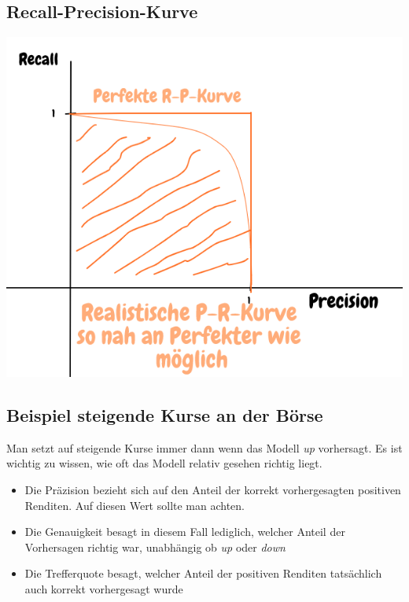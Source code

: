 \documentclass{report}
\begin{document}
\subsection{Recall-Precision-Kurve}
\begin{center}
  \includegraphics[scale=.225]{ml03_8}
\end{center}

\subsection{Beispiel steigende Kurse an der Börse}
Man setzt auf steigende Kurse immer dann wenn das Modell \textit{up} vorhersagt. Es ist wichtig zu wissen, wie oft das Modell relativ gesehen richtig liegt.
\begin{itemize}
  \item Die Präzision bezieht sich auf den Anteil der korrekt vorhergesagten positiven Renditen. Auf diesen Wert sollte man achten.
  \item Die Genauigkeit besagt in diesem Fall lediglich, welcher Anteil der Vorhersagen richtig war, unabhängig ob \textit{up} oder \textit{down}
  \item Die Trefferquote besagt, welcher Anteil der positiven Renditen tatsächlich auch korrekt vorhergesagt wurde
\end{itemize}
\end{document}
